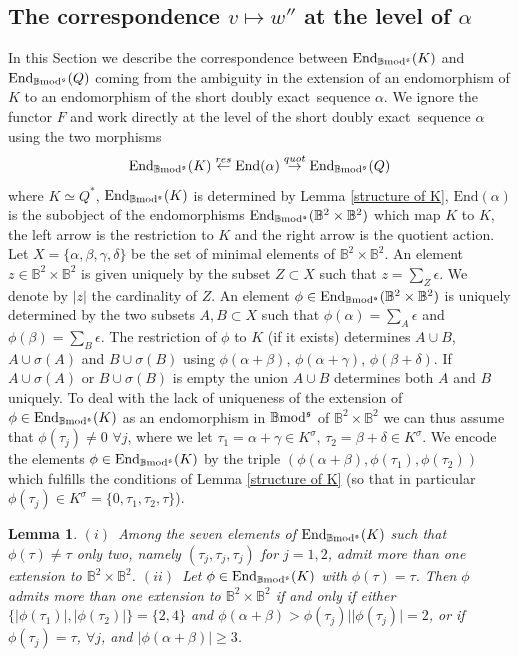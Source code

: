 \documentclass[12pt]{article}
\newtheorem{lem}[thm]{Lemma}
\def\End{{\rm End}}
\def\B{{\mathbb B}}
\def\exxx{{doubly exact}~}
\def\End{{\mbox{End}}}
\def\b2{{\rm \B mod^{\mathfrak s}}}
\begin{document}
\subsection{The correspondence $v\mapsto w''$ at the level of $\alpha$}\label{subsubcorrespondence}
In this Section we describe the correspondence between  $\End_\b2(K)$ and $\End_\b2(Q)$ coming from the ambiguity in the extension of an endomorphism of $K$ to an endomorphism of the short \exxx sequence $\alpha$.
We ignore the functor $F$ and work directly at the level of the short \exxx sequence $\alpha$ using the two morphisms 
\begin{equation}\label{quotient map}
	\End_\b2(K)\stackrel{{ res}}{\leftarrow} \End(\alpha)\stackrel{{ quot}}{\to} \End_\b2(Q)
\end{equation}
where $K\simeq Q^*$, $\End_\b2(K)$ is determined by Lemma \ref{structure of K}, $\End(\alpha)$ is the subobject of the endomorphisms $\End_\b2(\B^2\times \B^2)$  which map $K$ to $K$, the left arrow is the restriction to $K$ and the right arrow is the quotient action. Let $X=\{\alpha,\beta,\gamma,\delta\}$ be the set of minimal elements of $\B^2\times \B^2$.   An element $z\in\B^2\times \B^2$ is given uniquely by the subset $Z\subset X$ such that $z=\sum_Z \epsilon$. We denote by $\vert z\vert$ the cardinality of $Z$. An element $\phi\in\End_\b2(\B^2\times \B^2)$ is uniquely determined by the two subsets $A,B\subset X$ such that $\phi(\alpha)=\sum_A \epsilon$ and $\phi(\beta)=\sum_B \epsilon$. The restriction of $\phi$ to $K$ (if it exists) determines $A\cup B$, $A\cup \sigma(A)$ and $B\cup \sigma(B)$ using $\phi(\alpha+\beta)$, $\phi(\alpha+\gamma)$, $\phi(\beta+\delta)$. If $A\cup \sigma(A)$ or $B\cup \sigma(B)$ is empty the union $A\cup B$ determines both $A$ and $B$ uniquely.
  To deal with the lack of uniqueness of the extension of $\phi\in\End_\b2(K)$ as an endomorphism in $\b2$ of $\B^2\times \B^2$ we can thus assume that   $\phi(\tau_j)\neq 0$ $\forall j$, where we let $\tau_1=\alpha+\gamma\in K^\sigma$, $\tau_2=\beta+\delta\in K^\sigma$. We encode the elements $\phi\in\End_\b2(K)$ by the triple $(\phi(\alpha+\beta),\phi(\tau_1),\phi(\tau_2))$ which fulfills the conditions of Lemma \ref{structure of K} (so that in particular $\phi(\tau_j)\in K^\sigma=\{0,\tau_1,\tau_2,\tau\}$).
  \begin{lem}\label{lifting to alpha}
$(i)$~Among the seven elements of $\End_\b2(K)$ such that $\phi(\tau)\neq \tau$ only two, namely $(\tau_j,\tau_j,\tau_j)$ for $j=1,2$, admit more than one extension  to $\B^2\times \B^2$.\newline
 $(ii)$~Let $\phi\in\End_\b2(K)$ with $\phi(\tau)= \tau$. Then $\phi$ admits more than one extension to $\B^2\times \B^2$ if and only if either $\{\vert\phi(\tau_1)\vert,\vert\phi(\tau_2)\vert\}=\{2,4\}$ and $\phi(\alpha+\beta)>\phi(\tau_j)\mid \vert\phi(\tau_j)\vert=2$, or if $\phi(\tau_j)=\tau$, $\forall j$, and $\vert \phi(\alpha+\beta)\vert\geq 3$.
\end{lem}
\end{document}
